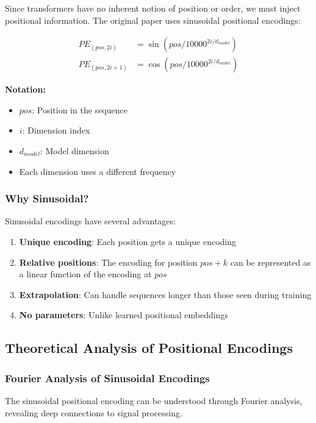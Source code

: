 \documentclass[11pt]{article}
\begin{document}
Since transformers have no inherent notion of position or order, we must inject positional information. The original paper uses sinusoidal positional encodings:

\begin{align}
PE_{(pos,2i)} &= \sin(pos/10000^{2i/d_{model}}) \\
PE_{(pos,2i+1)} &= \cos(pos/10000^{2i/d_{model}})
\end{align}
\begin{notationbox}
\textbf{Notation:}
\begin{itemize}
    \item $pos$: Position in the sequence
    \item $i$: Dimension index
    \item $d_{model}$: Model dimension
    \item Each dimension uses a different frequency
\end{itemize}
\end{notationbox}

\subsubsection{Why Sinusoidal?}

Sinusoidal encodings have several advantages:
\begin{enumerate}
    \item \textbf{Unique encoding}: Each position gets a unique encoding
    \item \textbf{Relative positions}: The encoding for position $pos + k$ can be represented as a linear function of the encoding at $pos$
    \item \textbf{Extrapolation}: Can handle sequences longer than those seen during training
    \item \textbf{No parameters}: Unlike learned positional embeddings
\end{enumerate}

\subsection{Theoretical Analysis of Positional Encodings}

\subsubsection{Fourier Analysis of Sinusoidal Encodings}

The sinusoidal positional encoding can be understood through Fourier analysis, revealing deep connections to signal processing.
\end{document}
